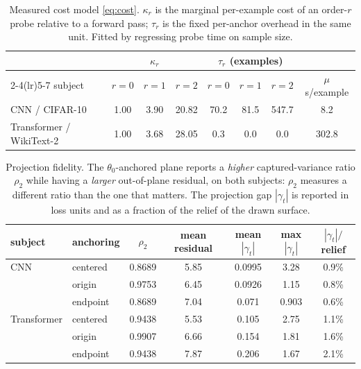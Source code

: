 
\begin{table}[t]
\centering
\caption{Measured cost model \eqref{eq:cost}. $\kappa_r$ is the marginal per-example
cost of an order-$r$ probe relative to a forward pass; $\tau_r$ is the fixed per-anchor
overhead in the same unit. Fitted by regressing probe time on sample size.}
\label{tab:cost}
\begin{tabular}{lccccccc}
\toprule
& \multicolumn{3}{c}{$\kappa_r$} & \multicolumn{3}{c}{$\tau_r$ (examples)} & \\
\cmidrule(lr){2-4}\cmidrule(lr){5-7}
subject & $r{=}0$ & $r{=}1$ & $r{=}2$ & $r{=}0$ & $r{=}1$ & $r{=}2$ & $\mu$s/example \\
\midrule
CNN / CIFAR-10 & 1.00 & 3.90 & 20.82 & 70.2 & 81.5 & 547.7 & 8.2 \\
Transformer / WikiText-2 & 1.00 & 3.68 & 28.05 & 0.3 & 0.0 & 0.0 & 302.8 \\
\bottomrule
\end{tabular}
\end{table}


\begin{table}[t]
\centering
\caption{Projection fidelity. The $\theta_0$-anchored plane reports a \emph{higher}
captured-variance ratio $\rho_2$ while having a \emph{larger} out-of-plane residual, on
both subjects: $\rho_2$ measures a different ratio than the one that matters. The
projection gap $|\gamma_t|$ is reported in loss units and as a fraction of the relief of
the drawn surface.}
\label{tab:fidelity}
\begin{tabular}{llccccc}
\toprule
subject & anchoring & $\rho_2$ & mean residual & mean $|\gamma_t|$ & max $|\gamma_t|$ &
$|\gamma_t|/$relief \\
\midrule
CNN & centered & 0.8689 & 5.85 & 0.0995 & 3.28 & 0.9\% \\
 & origin & 0.9753 & 6.45 & 0.0926 & 1.15 & 0.8\% \\
 & endpoint & 0.8689 & 7.04 & 0.071 & 0.903 & 0.6\% \\
Transformer & centered & 0.9438 & 5.53 & 0.105 & 2.75 & 1.1\% \\
 & origin & 0.9907 & 6.66 & 0.154 & 1.81 & 1.6\% \\
 & endpoint & 0.9438 & 7.87 & 0.206 & 1.67 & 2.1\% \\
\bottomrule
\end{tabular}
\end{table}


